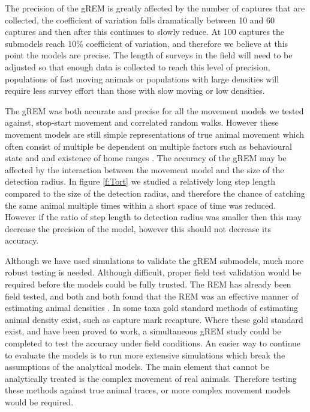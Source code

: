 \documentclass[a4paper,10pt,reqno,oneside]{amsart}
\begin{document}
The precision of the gREM is greatly affected by the number of captures that are collected, the coefficient of variation falls dramatically between 10 and 60 captures and then after this continues to slowly reduce. At 100 captures the submodels reach 10\% coefficient of variation, and therefore we believe at this point the models are precise. The length of surveys in the field will need to be adjusted so that enough data is collected to reach this level of precision, populations of fast moving animals or populations with large densities will require less survey effort than those with slow moving or low densities. 

The gREM was both accurate and precise for all the movement models we tested against, stop-start movement and correlated random walks. However these movement models are still simple representations of true animal movement which often consist of multiple be dependent on multiple factors such as behavioural state and and existence of home ranges \citep{smouse2010stochastic}. The accuracy of the gREM may be affected by the interaction between the movement model and the size of the detection radius. In figure \ref{f:Tort} we studied a relatively long step length compared to the size of the detection radius, and therefore the chance of catching the same animal multiple times within a short space of time was reduced. However if the ratio of step length to detection radius was smaller then this may decrease the precision of the model, however this should not decrease its accuracy. 

Although we have used simulations to validate the gREM submodels, much more robust testing is needed. Although difficult, proper field test validation would be required before the models could be fully trusted. The REM \citep{rowcliffe2008estimating} has already been field tested, and both \citet{rowcliffe2008estimating} and \citet{zero2013monitoring} both found that the REM was an effective manner of estimating animal densities \citep{rowcliffe2008estimating, zero2013monitoring}. In some taxa gold standard methods of estimating animal density exist, such as capture mark recapture. Where these gold standard exist, and have been proved to work, a simultaneous gREM study could be completed to test the accuracy under field conditions. An easier way to continue to evaluate the models is to run more extensive simulations which break the assumptions of the analytical models. The main element that cannot be analytically treated is the complex movement of real animals. Therefore testing these methods against true animal traces, or more complex movement models would be required.
\end{document}
